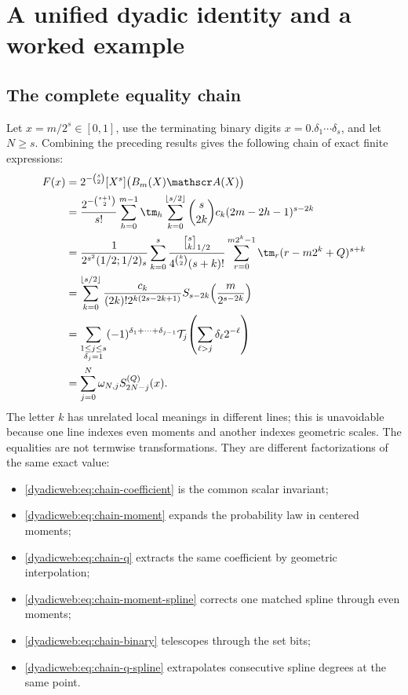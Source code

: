 \documentclass[11pt,oneside]{article}
\theoremstyle{definition}
\theoremstyle{remark}
\newcommand{\qbinom}[3]{\genfrac{[}{]}{0pt}{}{#1}{#2}_{#3}}
\begin{document}
\section{A unified dyadic identity and a worked example}
\label{dyadicweb:sec:worked}

\subsection{The complete equality chain}

Let $x=m/2^s\in[0,1]$, use the terminating binary digits
$x=0.\delta_1\cdots\delta_s$, and let $N\ge s$.  Combining the preceding results gives the
following chain of exact finite expressions:
\begin{align}
 F(x)
 &=2^{-\binom s2}[X^s]\bigl(B_m(X)\mathscr A(X)\bigr)     \label{dyadicweb:eq:chain-coefficient}\\
 &=\frac{2^{-\binom{s+1}{2}}}{s!}
   \sum_{h=0}^{m-1}\tm_h
   \sum_{k=0}^{\lfloor s/2\rfloor}
   \binom s{2k}c_k(2m-2h-1)^{s-2k}                       \label{dyadicweb:eq:chain-moment}\\
 &=\frac{1}{2^{s^2}(1/2;1/2)_s}
   \sum_{k=0}^{s}\frac{\qbinom sk{1/2}}{4^{\binom k2}(s+k)!}
   \sum_{r=0}^{m2^k-1}\tm_r(r-m2^k+Q)^{s+k}              \label{dyadicweb:eq:chain-q}\\
 &=\sum_{k=0}^{\lfloor s/2\rfloor}
   \frac{c_k}{(2k)!2^{k(2s-2k+1)}}
   S_{s-2k}\!\left(\frac{m}{2^{s-2k}}\right)             \label{dyadicweb:eq:chain-moment-spline}\\
 &=\sum_{\substack{1\le j\le s\\\delta_j=1}}
   (-1)^{\delta_1+\cdots+\delta_{j-1}}
   \mathcal T_j\!\left(\sum_{\ell>j}\delta_\ell2^{-\ell}\right) \label{dyadicweb:eq:chain-binary}\\
 &=\sum_{j=0}^{N}\omega_{N,j}S_{2N-j}^{(Q)}(x).           \label{dyadicweb:eq:chain-q-spline}
\end{align}
The letter $k$ has unrelated local meanings in different lines; this is unavoidable because
one line indexes even moments and another indexes geometric scales.  The equalities are not
termwise transformations.  They are different factorizations of the same exact value:
\begin{itemize}
\item \eqref{dyadicweb:eq:chain-coefficient} is the common scalar invariant;
\item \eqref{dyadicweb:eq:chain-moment} expands the probability law in centered moments;
\item \eqref{dyadicweb:eq:chain-q} extracts the same coefficient by geometric interpolation;
\item \eqref{dyadicweb:eq:chain-moment-spline} corrects one matched spline through even moments;
\item \eqref{dyadicweb:eq:chain-binary} telescopes through the set bits;
\item \eqref{dyadicweb:eq:chain-q-spline} extrapolates consecutive spline degrees at the same point.
\end{itemize}
\end{document}
